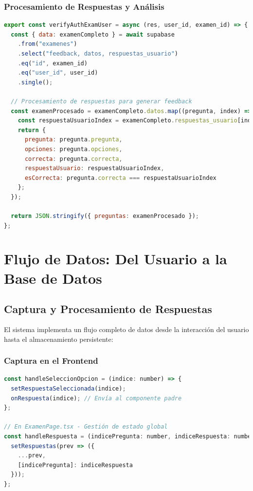 \documentclass[12pt,a4paper]{report}
\begin{document}
\subsubsection{Procesamiento de Respuestas y Análisis}

\begin{lstlisting}[language=JavaScript, caption=Función de verificación y procesamiento]
export const verifyAuthExamUser = async (res, user_id, examen_id) => {
  const { data: examenCompleto } = await supabase
    .from("examenes")
    .select("feedback, datos, respuestas_usuario")
    .eq("id", examen_id)
    .eq("user_id", user_id)
    .single();

  // Procesamiento de respuestas para generar feedback
  const examenProcesado = examenCompleto.datos.map((pregunta, index) => {
    const respuestaUsuarioIndex = examenCompleto.respuestas_usuario[index];
    return {
      pregunta: pregunta.pregunta,
      opciones: pregunta.opciones,
      correcta: pregunta.correcta,
      respuestaUsuario: respuestaUsuarioIndex,
      esCorrecta: pregunta.correcta === respuestaUsuarioIndex
    };
  });

  return JSON.stringify({ preguntas: examenProcesado });
};
\end{lstlisting}

\section{Flujo de Datos: Del Usuario a la Base de Datos}

\subsection{Captura y Procesamiento de Respuestas}

El sistema implementa un flujo completo de datos desde la interacción del usuario hasta el almacenamiento persistente:

\subsubsection{Captura en el Frontend}

\begin{lstlisting}[language=JavaScript, caption=Captura de respuestas en PreguntaCard.tsx]
const handleSeleccionOpcion = (indice: number) => {
  setRespuestaSeleccionada(indice);
  onRespuesta(indice); // Envía al componente padre
};

// En ExamenPage.tsx - Gestión de estado global
const handleRespuesta = (indicePregunta: number, indiceRespuesta: number) => {
  setRespuestas(prev => ({
    ...prev,
    [indicePregunta]: indiceRespuesta
  }));
};
\end{lstlisting}
\end{document}
